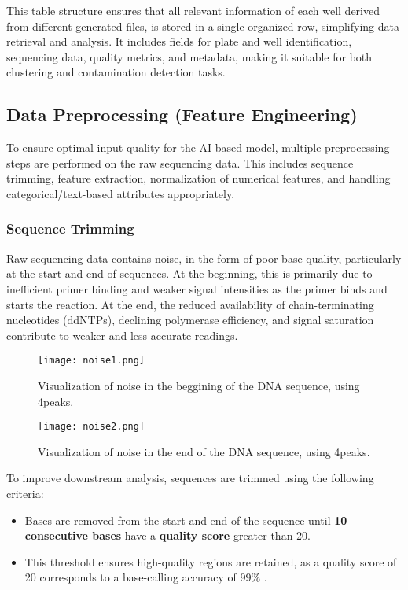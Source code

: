 This table structure ensures that all relevant information of each well derived from different generated files, is stored in a single organized row, simplifying data retrieval and analysis. It includes fields for plate and well identification, sequencing data, quality metrics, and metadata, making it suitable for both clustering and contamination detection tasks.


\subsection{Data Preprocessing (Feature Engineering)}

To ensure optimal input quality for the AI-based model, multiple preprocessing steps are performed on the raw sequencing data. This includes sequence trimming, feature extraction, normalization of numerical features, and handling categorical/text-based attributes appropriately.

\subsubsection{Sequence Trimming}
Raw sequencing data contains noise, in the form of poor base quality, particularly at the start and end of sequences. At the beginning, this is primarily due to inefficient primer binding and weaker signal intensities as the primer binds and starts the reaction. At the end, the reduced availability of chain-terminating nucleotides (ddNTPs), declining polymerase efficiency, and signal saturation contribute to weaker and less accurate readings. \cite{sanger_method_original}

\begin{figure}[h]
  \centering
  \texttt{[image: noise1.png]}
  \caption{Visualization of noise in the beggining of the DNA sequence, using 4peaks.}
  \label{fig:noise1}
\end{figure}

\begin{figure}[h]
  \centering
  \texttt{[image: noise2.png]}
  \caption{Visualization of noise in the end of the DNA sequence, using 4peaks.}
  \label{fig:noise2}
\end{figure}

To improve downstream analysis, sequences are trimmed using the following criteria:

\begin{itemize}
    \item Bases are removed from the start and end of the sequence until \textbf{10 consecutive bases} have a \textbf{quality score} greater than 20.
    \item This threshold ensures high-quality regions are retained, as a quality score of 20 corresponds to a base-calling accuracy of 99\% \cite{quality_score_threshold}.
\end{itemize}

